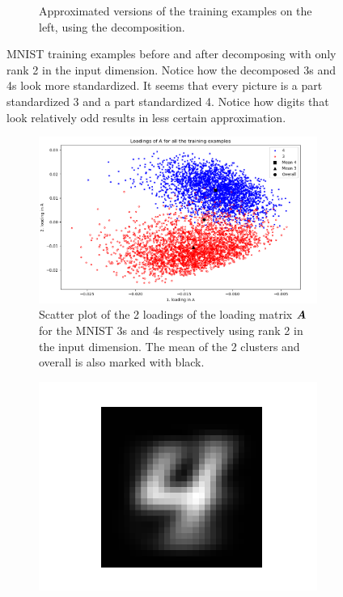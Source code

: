 \begin{figure}
\begin{subfigure}{0.45\linewidth}
        \captionsetup{width=.9\linewidth}
        \caption{Approximated versions of the training examples on the left, using the decomposition.}
    \end{subfigure}
    \captionsetup{width=.95\linewidth}
    \caption{MNIST training examples before and after decomposing with only rank 2 in the input dimension. Notice how the decomposed 3s and 4s look more standardized. It seems that every picture is a part standardized 3 and a part standardized 4. Notice how digits that look relatively odd results in less certain approximation.}
    \label{fig:decompExample3_4}
\end{figure}

\begin{figure}
    \centering
    \begin{subfigure}{0.99\linewidth}
        \includegraphics[width=\linewidth]{Pics/06_results/LoadingsOfAScatterMNIST.png}
        \caption{Scatter plot of the 2 loadings of the loading matrix $\boldsymbol{A}$ for the MNIST 3s and 4s respectively using rank 2 in the input dimension. The mean of the 2 clusters and overall is also marked with black.}
        \label{fig:loadingAMatrix}
    \end{subfigure}
    \begin{subfigure}{0.3\linewidth}
    \centering
        \includegraphics[width=.5\linewidth]{Pics/06_results/general4.png}

\end{subfigure}
\end{figure}
